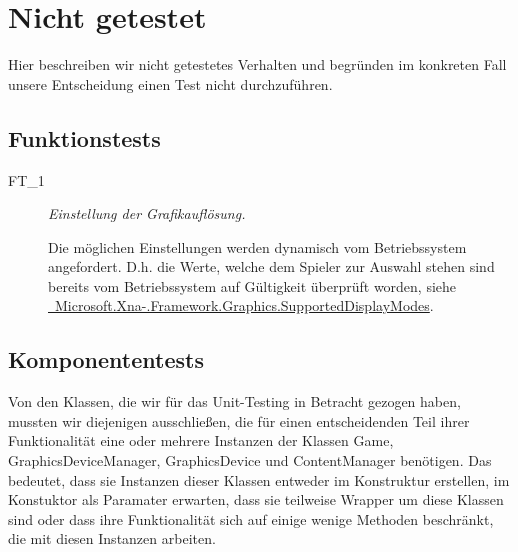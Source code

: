 %



\newpage



\section{Nicht getestet}
\label{Abschnitt:Tests:Nicht}

Hier beschreiben wir nicht getestetes Verhalten und begründen im konkreten Fall unsere Entscheidung einen Test nicht durchzuführen.
~\\




\subsection*{Funktionstests}
\label{Abschnitt:Tests:Nicht:Funktion}

\begin{description}

	\item[FT\_1] \textit{Einstellung der Grafikauflösung.} \hfill\\
	
	\label{FT:1}
	
	Die möglichen Einstellungen werden dynamisch vom Betriebssystem angefordert. D.h. die Werte, welche dem Spieler zur Auswahl stehen sind bereits vom Betriebssystem auf Gültigkeit überprüft worden, siehe  \href{http://msdn.microsoft.com/de-de/library/microsoft.xna.framework.graphics.graphicsadapter.supporteddisplaymodes}{\mousecursor~Microsoft.Xna-.Framework.Graphics.SupportedDisplayModes}.
	~\\
	
\end{description}




\subsection*{Komponententests}
\label{Abschnitt:Tests:Nicht:Komponenten}

Von den Klassen, die wir für das Unit-Testing in Betracht gezogen haben, mussten wir diejenigen ausschließen, die für einen entscheidenden Teil ihrer Funktionalität eine oder mehrere Instanzen der Klassen Game, GraphicsDeviceManager, GraphicsDevice und ContentManager benötigen. Das bedeutet, dass sie Instanzen dieser Klassen entweder im Konstruktur erstellen, im Konstuktor als Paramater erwarten, dass sie teilweise Wrapper um diese Klassen sind oder dass ihre Funktionalität sich auf einige wenige Methoden beschränkt, die mit diesen Instanzen arbeiten.

